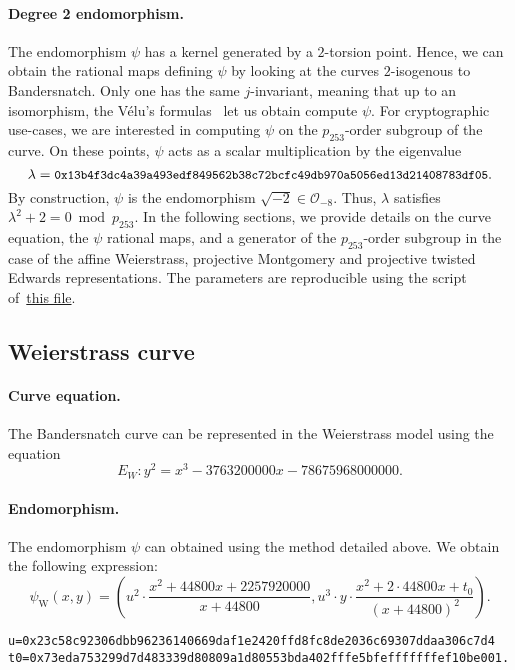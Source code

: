 \documentclass{article}
\theoremstyle{definition}
\newtheorem*{remark}{Remark}
\begin{document}
\paragraph{Degree 2 endomorphism.}
The endomorphism $\psi$ has a kernel generated by a $2$-torsion
point. Hence, we can obtain the rational maps defining $\psi$ by
looking at the curves $2$-isogenous to Bandersnatch. Only one has the
same $j$-invariant, meaning that up to an isomorphism, the Vélu's
formulas~\cite{velu71} let us obtain compute $\psi$.
For cryptographic use-cases, we are interested in computing $\psi$ on
the $p_{253}$-order subgroup of the curve. On these points, $\psi$
acts as a scalar multiplication by the eigenvalue
$$\lambda = \text{\small{\tt
    0x13b4f3dc4a39a493edf849562b38c72bcfc49db970a5056ed13d21408783df05}}.$$
By construction, $\psi$ is the endomorphism $\sqrt{-2}\in \mathcal
O_{-8}$. Thus, $\lambda$ satisfies
$\lambda^2+2 = 0 \bmod p_{253}$.
In the following sections, we provide details on the curve equation,
the $\psi$ rational maps, and a generator of the $p_{253}$-order
subgroup in the case of the affine Weierstrass, projective Montgomery
and projective twisted Edwards representations.
The parameters are reproducible using the script
of~\href{https://github.com/asanso/Bandersnatch/blob/main/code/get\_params.py}{this
  file}.

\subsection{Weierstrass curve}
\paragraph{Curve equation.}
The Bandersnatch curve can be represented in the Weierstrass model
using the equation
$$E_W:y^2 = x^3 -3763200000x -78675968000000.$$


\paragraph{Endomorphism.}
The endomorphism $\psi$ can obtained using the method detailed above.
We obtain the following expression:
$$\psi_\text{W}(x,y) = \left(u^2\cdot \frac{x^2+44800x+2257920000}{x+44800}, u^3\cdot
y\cdot \frac{x^2+2\cdot 44800x+t_0}{(x+44800)^2}\right).$$
\begin{verbatim}
u=0x23c58c92306dbb96236140669daf1e2420ffd8fc8de2036c69307ddaa306c7d4
t0=0x73eda753299d7d483339d80809a1d80553bda402fffe5bfefffffffef10be001.
\end{verbatim}
\end{document}

